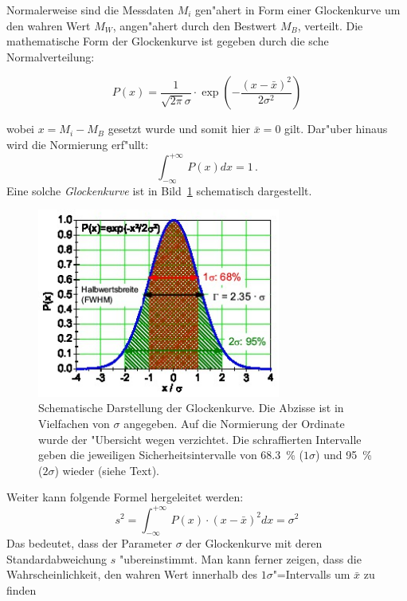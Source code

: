 Normalerweise sind die Messdaten $M_i$ gen"ahert in Form einer
Glockenkurve um den wahren Wert $M_W$, angen"ahert durch den
Bestwert $M_B$, verteilt. Die mathematische Form der
Glockenkurve ist gegeben durch die
sche
Normalverteilung:
%
\begin{important}
\begin{equation} \label{g}
  P(x) =
  \frac{1}{\sqrt{2\pi} \sigma} \cdot
  \exp\left( -\frac{(x-\bar{x})^{2}}{2\sigma^{2}} \right)
\end{equation}
\end{important}
%
wobei $x = M_i - M_B$ gesetzt wurde und somit hier $\bar{x}=0$
gilt. Dar"uber hinaus wird die Normierung erf"ullt:
%
\begin{equation} \label{h}
  \int_{-\infty}^{+\infty}\,P(x) dx = 1 \, .
\end{equation}
%
Eine solche \emph{Glockenkurve} ist in Bild~\ref{a:glockenkurve}
schematisch dargestellt.
%
\begin{figure}[htb]
  \centering
  \includegraphics[width=8cm]{00_einl/gaussfkt}
 \caption[Gau"ssche Glockenkurve]{\label{a:glockenkurve}Schematische Darstellung
   der Glockenkurve. Die Abzisse ist in Vielfachen von $\sigma$ angegeben.
   Auf die Normierung
   der Ordinate wurde der "Ubersicht wegen verzichtet. Die schraffierten
   Intervalle geben die jeweiligen Sicherheitsintervalle von 68.3~\%
   ($1\sigma$) und 95~\% ($2\sigma$) wieder (siehe Text).}
\end{figure}
%
Weiter kann folgende Formel hergeleitet werden:
%
\begin{equation} \label{i}
 s^2 = \int_{-\infty}^{+\infty}\,P(x) \cdot (x-\bar{x})^{2} dx = \sigma^{2}
\end{equation}
%
Das bedeutet, dass der Parameter $\sigma$ der Glockenkurve mit deren 
Standardabweichung $s$ "ubereinstimmt. Man kann
ferner zeigen, dass die Wahrscheinlichkeit, den wahren Wert
innerhalb des $1\sigma$"=Intervalls um $\bar{x}$ zu finden

